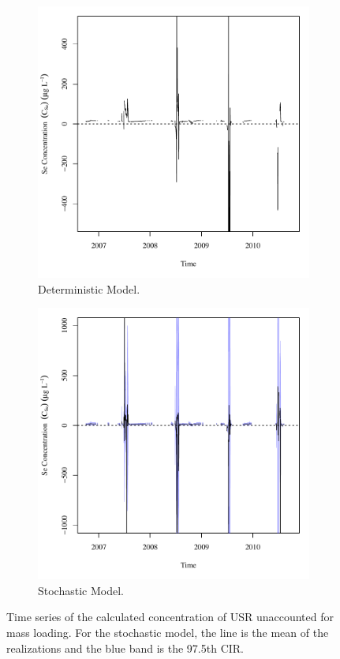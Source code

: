\begin{figure}[htbp]
\centering
	\begin{subfigure}{0.5\textwidth}
		\centering
		\includegraphics[width=0.9\linewidth]{"Figures/Results_DSR/Deterministic/Balance C"}
		\caption{Deterministic Model.}
	\end{subfigure}%
	\begin{subfigure}{0.5\textwidth}
		\centering
		\includegraphics[width=0.9\linewidth]{"Figures/Results_DSR/Stochastic/Balance C"}
		\caption{Stochastic Model.}
	\end{subfigure}
	\caption[Time series of the calculated concentration of USR unaccounted for mass loading.]{Time series of the calculated concentration of USR unaccounted for mass loading.  For the stochastic model, the line is the mean of the realizations and the blue band is the 97.5th CIR.}
	\label{fig:DSRConc}
\end{figure}

